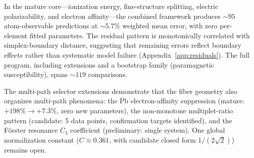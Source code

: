 \documentclass[11pt,a4paper]{article}
\begin{document}
In the mature core---ionization energy, fine-structure splitting, electric polarizability, and electron affinity---the combined framework produces ${\sim}95$ atom-observable predictions at ${\sim}5.7\%$ weighted mean error, with zero per-element fitted parameters. The residual pattern is monotonically correlated with simplex-boundary distance, suggesting that remaining errors reflect boundary effects rather than systematic model failure (Appendix~\ref{app:residuals}). The full program, including extensions and a bootstrap family (paramagnetic susceptibility), spans ${\sim}119$ comparisons.

The multi-path selector extensions demonstrate that the fiber geometry also organizes multi-path phenomena: the Pb electron-affinity suppression (mature: $+198\% \to +7.3\%$, zero new parameters), the non-monotone multiplet-ratio pattern (candidate: 5 data points, confirmation targets identified), and the F\"orster resonance $C_3$ coefficient (preliminary: single system). One global normalization constant ($C \approx 0.361$, with candidate closed form $1/(2\sqrt{2})$) remains open.
\end{document}
